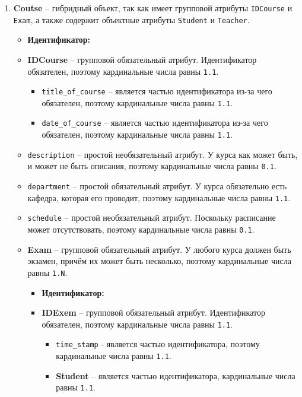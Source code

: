 \documentclass[a4paper, 14pt]{extarticle}
\begin{document}
\begin{enumerate}
    \item \textbf{Coutse} -- гибридный объект, так как имеет групповой атрибуты \texttt{IDCourse} и \texttt{Exam}, а также содержит объектные атрибуты \texttt{Student} и \texttt{Teacher}.
    \begin{itemize}
        \item \textbf{Идентификатор:} 
        \item \textbf{IDCourse} – групповой обязательный атрибут. Идентификатор обязателен, поэтому кардинальные числа равны \texttt{1.1}.
        \begin{itemize}
            \item \texttt{title\_of\_course} – является частью идентификатора из-за чего обязателен, поэтому кардинальные числа равны \texttt{1.1}.
            \item \texttt{date\_of\_course} – является частью идентификатора из-за чего обязателен, поэтому кардинальные числа равны \texttt{1.1}.
        \end{itemize}
        \item \texttt{description} – простой необязательный атрибут. У курса как может быть, и может не быть описания, поэтому кардинальные числа равны \texttt{0.1}.
        \item \texttt{department} – простой обязательный атрибут. У курса обязательно есть кафедра, которая его проводит, поэтому кардинальные числа равны \texttt{1.1}.
        \item \texttt{schedule} – простой необязательный атрибут. Поскольку расписание может отсутствовать, поэтому кардинальные числа равны \texttt{0.1}.
        \item \textbf{Exam} – групповой обязательный атрибут. У любого курса должен быть экзамен, причём их может быть несколько, поэтому кардинальные числа равны \texttt{1.N}.
        \begin{itemize}
            \item \textbf{Идентификатор:} 
            \item \textbf{IDExem} – групповой обязательный атрибут. Идентификатор обязателен, поэтому кардинальные числа равны \texttt{1.1}.
            \begin{itemize}
                \item  \texttt{time\_stamp} - является частью идентификатора, поэтому кардинальные числа равны \texttt{1.1}.
                \item \textbf{Student} – является частью идентификатора, кардинальные числа равны \texttt{1.1}.
            \end{itemize}

\end{itemize}
\end{itemize}
\end{enumerate}
\end{document}
